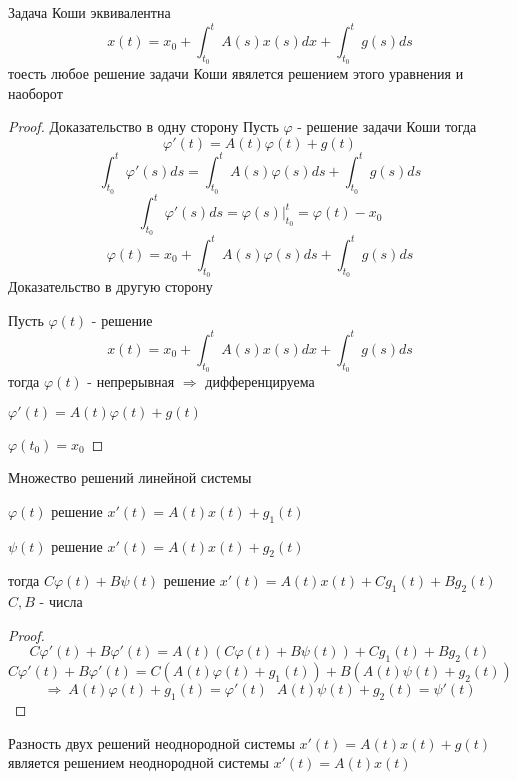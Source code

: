 \begin{block}[Лемма]
  Задача Коши эквивалентна
  $$
  x(t) = x_0 + \int_{t_0}^t A(s)x(s)dx +
  \int_{t_0}^t g(s)ds
  $$
  тоесть любое решение задачи Коши явялется решением этого уравнения и наоборот
\end{block}

\begin{proof}
  Доказательство в одну сторону
  Пусть $\varphi$ - решение задачи Коши тогда
  $$
  \varphi'(t) = A(t)\varphi(t) + g(t)
  $$
  $$
  \int_{t_0}^t \varphi'(s)ds = \int_{t_0}^t A(s) \varphi(s)ds +
  \int_{t_0}^t g(s) ds
  $$
  $$
  \int_{t_0}^t \varphi'(s)ds = \varphi(s)|_{t_0}^t = \varphi(t) - x_0
  $$
  $$
  \varphi(t) = x_0 + \int_{t_0}^t A(s) \varphi(s) ds  + \int_{t_0}^t g(s)ds
  $$
  Доказательство в другую сторону

  Пусть $\varphi(t)$ - решение
  $$
  x(t) = x_0 + \int_{t_0}^t A(s)x(s)dx +
  \int_{t_0}^t g(s)ds
  $$
  тогда $\varphi(t)$ - непрерывная $\Rightarrow$ дифференцируема

  $\varphi'(t) = A(t)\varphi(t) + g(t)$

  $\varphi(t_0) = x_0$
\end{proof}

\begin{title}[\Large]
  Множество решений линейной системы
\end{title}

\begin{theorem}
  $\varphi(t)$ решение $x'(t) = A(t)x(t) + g_1(t)$

  $\psi(t)$ решение $x'(t) = A(t)x(t) + g_2(t)$

  тогда $C\varphi(t) + B\psi(t)$ решение $x'(t) = A(t)x(t) + Cg_1(t) + Bg_2(t)$
  $C,B$ - числа
\end{theorem}

\begin{proof}
  $$
  C\varphi'(t) + B\varphi'(t) = A(t)(C\varphi(t) + B\psi(t)) + Cg_1(t) +
  Bg_2(t)
  $$
  $$
  C\varphi'(t) + B\varphi'(t) = C(A(t)\varphi(t) + g_1(t))+
  B(A(t)\psi(t) + g_2(t))
  $$
  $$
  \Rightarrow ~ A(t)\varphi(t) + g_1(t) = \varphi'(t) ~~~
  A(t)\psi(t) + g_2(t) = \psi'(t)
  $$
\end{proof}

\begin{block}[Следствие 1]
  Разность двух решений неоднородной системы $x'(t) = A(t)x(t) + g(t)$
  является решением неоднородной системы $x'(t) = A(t)x(t)$
\end{block}

